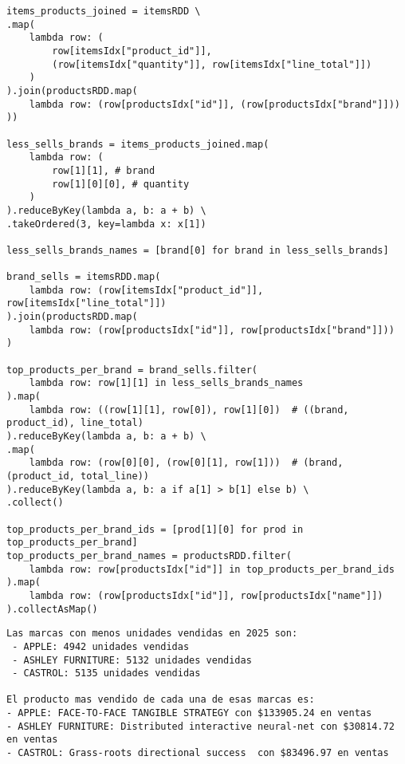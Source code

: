 \begin{lstlisting}[caption={Resolución de la consulta 3 propuesta propia.}, xleftmargin=20pt, xrightmargin=20pt]
items_products_joined = itemsRDD \
.map(
    lambda row: (
        row[itemsIdx["product_id"]], 
        (row[itemsIdx["quantity"]], row[itemsIdx["line_total"]])
    )
).join(productsRDD.map(
    lambda row: (row[productsIdx["id"]], (row[productsIdx["brand"]]))
))

less_sells_brands = items_products_joined.map(
    lambda row: (
        row[1][1], # brand
        row[1][0][0], # quantity
    )
).reduceByKey(lambda a, b: a + b) \
.takeOrdered(3, key=lambda x: x[1])

less_sells_brands_names = [brand[0] for brand in less_sells_brands]

brand_sells = itemsRDD.map(
    lambda row: (row[itemsIdx["product_id"]], row[itemsIdx["line_total"]])
).join(productsRDD.map(
    lambda row: (row[productsIdx["id"]], row[productsIdx["brand"]]))
)

top_products_per_brand = brand_sells.filter(
    lambda row: row[1][1] in less_sells_brands_names
).map(
    lambda row: ((row[1][1], row[0]), row[1][0])  # ((brand, product_id), line_total)
).reduceByKey(lambda a, b: a + b) \
.map(
    lambda row: (row[0][0], (row[0][1], row[1]))  # (brand, (product_id, total_line))
).reduceByKey(lambda a, b: a if a[1] > b[1] else b) \
.collect()

top_products_per_brand_ids = [prod[1][0] for prod in top_products_per_brand]
top_products_per_brand_names = productsRDD.filter(
    lambda row: row[productsIdx["id"]] in top_products_per_brand_ids
).map(
    lambda row: (row[productsIdx["id"]], row[productsIdx["name"]])
).collectAsMap()
\end{lstlisting}

\begin{lstlisting}[style=console, caption=Resultados de la consulta 3 propuesta propia, label={lst:propia_q3_results}, xleftmargin=30pt, xrightmargin=30pt]
Las marcas con menos unidades vendidas en 2025 son:
 - APPLE: 4942 unidades vendidas
 - ASHLEY FURNITURE: 5132 unidades vendidas
 - CASTROL: 5135 unidades vendidas

El producto mas vendido de cada una de esas marcas es:
- APPLE: FACE-TO-FACE TANGIBLE STRATEGY con $133905.24 en ventas
- ASHLEY FURNITURE: Distributed interactive neural-net con $30814.72 en ventas
- CASTROL: Grass-roots directional success  con $83496.97 en ventas
\end{lstlisting}

